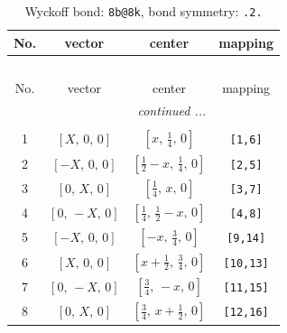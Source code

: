 \documentclass[fleqn,8pt]{jsarticle}
\begin{document}
\begin{longtable}{cccc}
\caption{Wyckoff bond: {\tt 8b@8k}, bond symmetry: {\tt .2.}}
 \\
 \hline \hline
No. & vector & center & mapping \\ \hline \endfirsthead

\multicolumn{3}{l}{\tablename\ \thetable{}} \\
 \hline \hline
No. & vector & center & mapping \\ \hline \endhead

 \hline \hline
\multicolumn{3}{r}{\footnotesize\it continued ...} \\ \endfoot

 \hline \hline
\multicolumn{3}{r}{} \\ \endlastfoot

1 & $\left[ X,\, 0,\, 0 \right]$ & $\left[ x,\, \frac{1}{4},\, 0 \right]$ & {\tt [1,6]} \\ \hline
2 & $\left[ - X,\, 0,\, 0 \right]$ & $\left[ \frac{1}{2} - x,\, \frac{1}{4},\, 0 \right]$ & {\tt [2,5]} \\ \hline
3 & $\left[ 0,\, X,\, 0 \right]$ & $\left[ \frac{1}{4},\, x,\, 0 \right]$ & {\tt [3,7]} \\ \hline
4 & $\left[ 0,\, - X,\, 0 \right]$ & $\left[ \frac{1}{4},\, \frac{1}{2} - x,\, 0 \right]$ & {\tt [4,8]} \\ \hline
5 & $\left[ - X,\, 0,\, 0 \right]$ & $\left[ - x,\, \frac{3}{4},\, 0 \right]$ & {\tt [9,14]} \\ \hline
6 & $\left[ X,\, 0,\, 0 \right]$ & $\left[ x + \frac{1}{2},\, \frac{3}{4},\, 0 \right]$ & {\tt [10,13]} \\ \hline
7 & $\left[ 0,\, - X,\, 0 \right]$ & $\left[ \frac{3}{4},\, - x,\, 0 \right]$ & {\tt [11,15]} \\ \hline
8 & $\left[ 0,\, X,\, 0 \right]$ & $\left[ \frac{3}{4},\, x + \frac{1}{2},\, 0 \right]$ & {\tt [12,16]} \\
\end{longtable}
\renewcommand{\arraystretch}{1.2}
\end{document}
